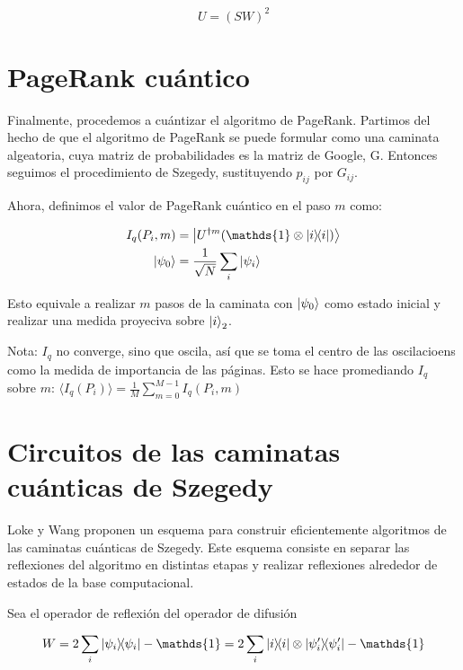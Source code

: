 \begin{equation}
    U = (S W)^2
\end{equation}

\section{PageRank cuántico}

Finalmente, procedemos a cuántizar el algoritmo de PageRank. Partimos del hecho de que el algoritmo de PageRank se puede formular como una caminata algeatoria, cuya matriz de probabilidades es la matriz de Google, G. Entonces seguimos el procedimiento de Szegedy, sustituyendo $p_{i j}$ por $G_{i j}$.

Ahora, definimos el valor de PageRank cuántico en el paso $m$ como:

\begin{align*}
I_q(P_i,m) &= \ket{U^{\dagger m}(\mathds{1} \otimes \ketbra{i}{i})} \\
\ket{\psi_0} &= \frac{1}{\sqrt{N}} \sum\limits_i \ket{\psi_i}
\end{align*}

Esto equivale a realizar $m$ pasos de la caminata con $\ket{\psi_0}$ como estado inicial y realizar una medida proyeciva sobre $\ket{i}_2$.

Nota: $I_q$ no converge, sino que oscila, así que se toma el centro de las oscilacioens como la medida de importancia de las páginas. Esto se hace promediando $I_q$ sobre $m$: $\langle I_q(P_i) \rangle = \frac{1}{M} \sum\limits_{m=0}^{M-1} I_q(P_i,m)$ 

\section{Circuitos de las caminatas cuánticas de Szegedy}

Loke y Wang \cite{loke} proponen un esquema para construir eficientemente algoritmos de las caminatas cuánticas de Szegedy. Este esquema consiste en separar las reflexiones del algoritmo en distintas etapas y realizar reflexiones alrededor de estados de la base computacional.

Sea el operador de reflexión del operador de difusión

\begin{equation}
    W = 2 \sum\limits_i \ketbra{\psi_i}{\psi_i} - \mathds{1} = 2 \sum\limits_i \ketbra{i}{i} \otimes \ketbra{\psi_i^\prime}{\psi_i^\prime} - \mathds{1}
\end{equation}

